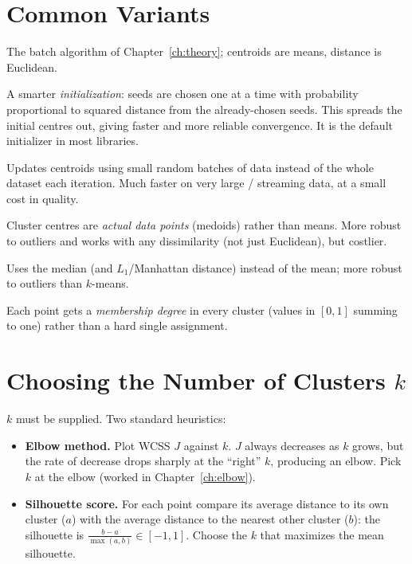 \documentclass[11pt,a4paper]{report}
\theoremstyle{definition}
\theoremstyle{plain}
\theoremstyle{remark}
\begin{document}
	\section{Common Variants}
	\begin{description}[leftmargin=0pt,itemsep=4pt]
		\item[\textbf{Lloyd's / standard $k$-means.}] The batch algorithm of
		Chapter~\ref{ch:theory}; centroids are means, distance is Euclidean.
		
		\item[\textbf{$k$-means\texttt{++}.}] A smarter \emph{initialization}: seeds are
		chosen one at a time with probability proportional to squared distance from the
		already-chosen seeds. This spreads the initial centres out, giving faster and
		more reliable convergence. It is the default initializer in most libraries.
		
		\item[\textbf{Mini-batch $k$-means.}] Updates centroids using small random
		batches of data instead of the whole dataset each iteration. Much faster on
		very large / streaming data, at a small cost in quality.
		
		\item[\textbf{$k$-medoids (PAM).}] Cluster centres are \emph{actual data points}
		(medoids) rather than means. More robust to outliers and works with any
		dissimilarity (not just Euclidean), but costlier.
		
		\item[\textbf{$k$-medians.}] Uses the median (and $L_1$/Manhattan distance)
		instead of the mean; more robust to outliers than $k$-means.
		
		\item[\textbf{Fuzzy $c$-means (soft $k$-means).}] Each point gets a
		\emph{membership degree} in every cluster (values in $[0,1]$ summing to one)
		rather than a hard single assignment.
	\end{description}
	
	\section{Choosing the Number of Clusters $k$}
	$k$ must be supplied. Two standard heuristics:
	\begin{itemize}[nosep]
		\item \textbf{Elbow method.} Plot WCSS $J$ against $k$. $J$ always decreases
		as $k$ grows, but the rate of decrease drops sharply at the ``right''
		$k$, producing an elbow. Pick $k$ at the elbow
		(worked in Chapter~\ref{ch:elbow}).
		\item \textbf{Silhouette score.} For each point compare its average distance
		to its own cluster ($a$) with the average distance to the nearest other
		cluster ($b$): the silhouette is $\tfrac{b-a}{\max(a,b)}\in[-1,1]$.
		Choose the $k$ that maximizes the mean silhouette.
	\end{itemize}
	
\end{document}
